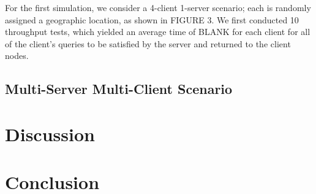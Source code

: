 For the first simulation, we consider a 4-client 1-server scenario; each is randomly assigned a geographic location, as shown in FIGURE 3. We first conducted 10 throughput tests, which yielded an average time of BLANK for each client for all of the client's queries to be satisfied by the server and returned to the client nodes. 

\subsection{Multi-Server Multi-Client Scenario}


\section{Discussion}

\section{Conclusion}

